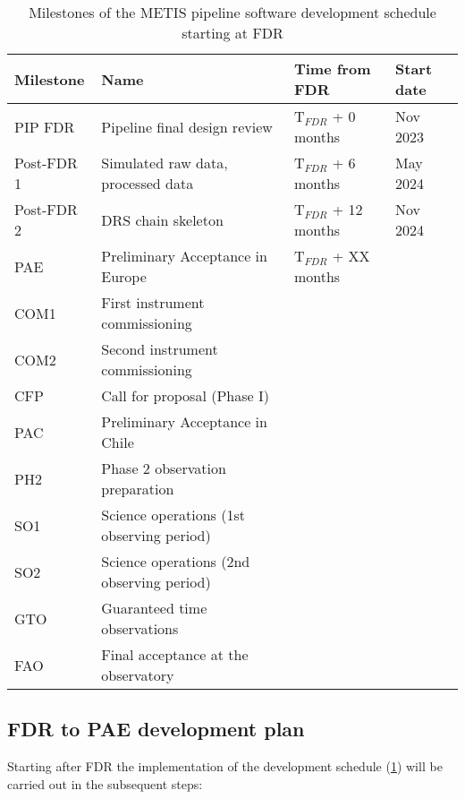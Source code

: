 \begin{table}
    \caption[Development schedule]{Milestones of the METIS pipeline software development schedule starting at FDR}
  \label{tab:development_schedule}
  \centering\scriptsize
  \begin{tabularx}{\textwidth}{llll}
    \hline
    Milestone & Name & Time from FDR & Start date \\
    \hline\hline
    PIP FDR          & Pipeline final design review & T$_ {FDR}$ + 0 months & Nov 2023 \\
    Post-FDR 1       & Simulated raw data, processed data &  T$_ {FDR}$ + 6 months & May 2024 \\
    Post-FDR 2       & DRS chain skeleton               &  T$_{FDR}$ + 12 months & Nov 2024 \\
    PAE              & Preliminary Acceptance in Europe &  T$_{FDR}$ + XX months &  \\
    COM1             & First instrument commissioning &  & \\
    COM2             & Second instrument commissioning &  & \\
    CFP              & Call for proposal (Phase I) &  & \\
    PAC              & Preliminary Acceptance in Chile &  & \\
    PH2              & Phase 2 observation preparation &  & \\
    SO1              & Science operations (1st observing period) &  & \\
    SO2              & Science operations (2nd observing period) &  & \\
    GTO              & Guaranteed time observations &  & \\
    FAO              & Final acceptance at the observatory & & \\
    \hline
  \end{tabularx}
\end{table}

\subsection{FDR to PAE development plan}
\label{ssec:fdr2pae}

Starting after FDR the implementation of the development schedule (\ref{tab:development_schedule}) will be carried out in the subsequent steps:

